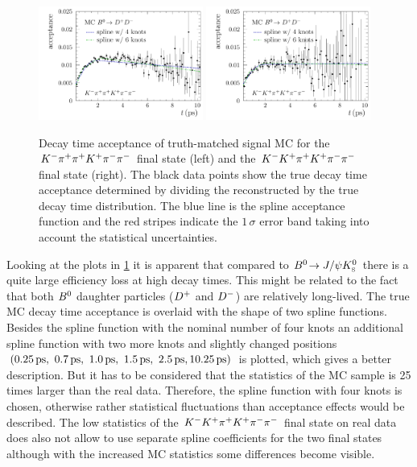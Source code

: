 \begin{figure}[htb]
\centering
\includegraphics[width=0.48\textwidth]{07-B02DD/tikz/pdf/Acceptancespline_nolog_MC_Kpipi.pdf}
\includegraphics[width=0.48\textwidth]{07-B02DD/tikz/pdf/Acceptancespline_nolog_MC_KKpi.pdf}
\caption{Decay time acceptance of truth-matched signal MC for the ${{K}^-}{{\pi}^+}{{\pi}^+}{{K}^+}{{\pi}^-}{{\pi}^-}$
final state (left) and the ${{K}^-}{{K}^+}{{\pi}^+}{{K}^+}{{\pi}^-}{{\pi}^-}$ final state (right). The black data
points show the true decay time acceptance determined by dividing the
reconstructed by the true decay time distribution. The blue line is the spline
acceptance function and the red stripes indicate the $1\,\sigma$ error band
taking into account the statistical uncertainties.}
\label{fig:b02dd:decaytimefit:acceptance_MC}
\end{figure}

Looking at the plots in \cref{fig:b02dd:decaytimefit:acceptance_MC} it is
apparent that compared to ${{B}^0}\!\rightarrow J/\psi{\ensuremath{{K}^0_{\mathrm{ \scriptscriptstyle S}}}}$ there is a quite large efficiency loss
at high decay times. This might be related to the fact that both ${{B}^0}$
daughter particles (${{D}^+}$ and ${{D}^-}$) are relatively long-lived. The true MC
decay time acceptance is overlaid with the shape of two spline functions.
Besides the spline function with the nominal number of four knots an
additional spline function with two more knots and slightly changed positions
$(\SIlist[list-final-separator={, }]{0.25;0.7;1.0;1.5;2.5;10.25}{\ps})$ is
plotted, which gives a better description. But it has to be considered that
the statistics of the MC sample is \num{25} times larger than the real data.
Therefore, the spline function with four knots is chosen, otherwise rather
statistical fluctuations than acceptance effects would be described. The low
statistics of the ${{K}^-}{{K}^+}{{\pi}^+}{{K}^+}{{\pi}^-}{{\pi}^-}$ final state on real data does also not allow to
use separate spline coefficients for the two final states although with the
increased MC statistics some differences become visible.
